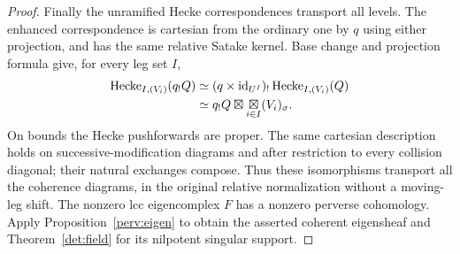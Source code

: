 \begin{proof}
Finally the unramified Hecke correspondences transport all levels.
The enhanced correspondence is cartesian from the ordinary one by
$q$ using either projection, and has the same relative Satake
kernel.  Base change and projection formula give, for every leg set
$I$,
\begin{align*}
 \operatorname{Hecke}_{I,(V_i)}(q_!Q)
 &\simeq(q\times\mathrm{id}_{U^I})_!\operatorname{Hecke}_{I,(V_i)}(Q)\\
 &\simeq q_!Q\boxtimes\mathop{\boxtimes}_{i\in I}(V_i)_\sigma.
\end{align*}
On bounds the Hecke pushforwards are proper.  The same cartesian
description holds on successive-modification diagrams and after
restriction to every collision diagonal; their natural exchanges
compose.  Thus these isomorphisms transport all the coherence
diagrams, in the original relative normalization without a
moving-leg shift.  The nonzero lcc eigencomplex $F$ has a nonzero
perverse cohomology.  Apply Proposition~\ref{perv:eigen} to obtain
the asserted coherent eigensheaf and Theorem~\ref{det:field} for
its nilpotent singular support.
\end{proof}
